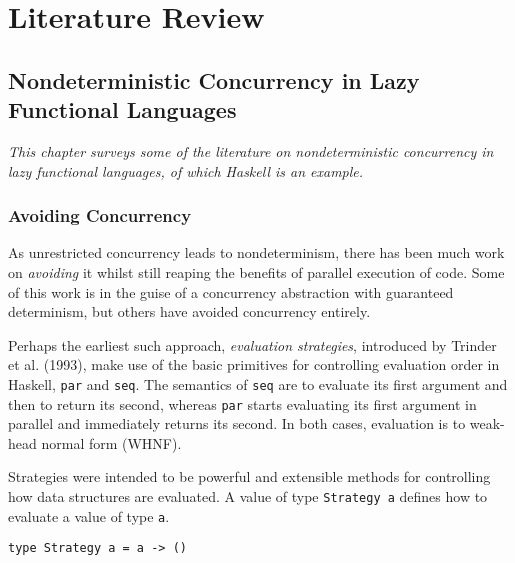 \part{Literature Review}


\chapter{Nondeterministic Concurrency in Lazy Functional Languages}
\label{chp:litrev}

\textit{This chapter surveys some of the literature on
  nondeterministic concurrency in lazy functional languages, of which
  Haskell is an example.}

\section{Avoiding Concurrency}
\label{sec:litrev-strategies}

As unrestricted concurrency leads to nondeterminism, there has been
much work on \textit{avoiding} it whilst still reaping the benefits of
parallel execution of code. Some of this work is in the guise of a
concurrency abstraction with guaranteed determinism, but others have
avoided concurrency entirely.

Perhaps the earliest such approach, \textit{evaluation strategies},
introduced by Trinder et al. (1993)\nocite{trinder}, make use of the
basic primitives for controlling evaluation order in Haskell,
\verb|par| and \verb|seq|. The semantics of \verb|seq| are to evaluate
its first argument and then to return its second, whereas \verb|par|
starts evaluating its first argument in parallel and immediately
returns its second. In both cases, evaluation is to weak-head normal
form (WHNF).

Strategies were intended to be powerful and extensible methods for
controlling how data structures are evaluated. A value of type
\verb|Strategy a| defines how to evaluate a value of type
\verb|a|.

\begin{verbatim}
type Strategy a = a -> ()
\end{verbatim}

